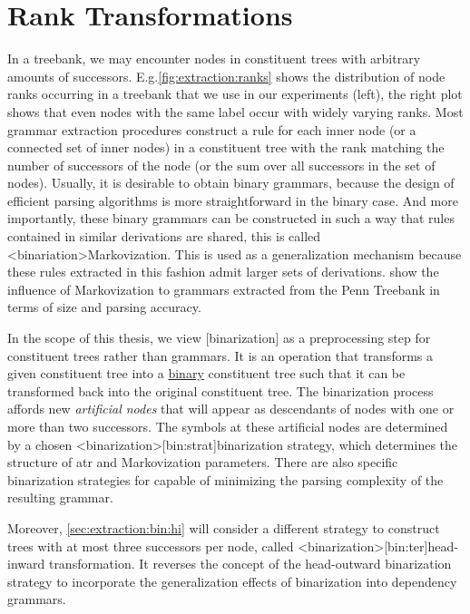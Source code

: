 \documentclass[../../document.tex]{subfiles}
\begin{document}
    \section{Rank Transformations}\label{sec:ranktransformations}
    In a treebank, we may encounter nodes in constituent trees with arbitrary amounts of successors.
    E.g.\@ \cref{fig:extraction:ranks} shows the distribution of node ranks occurring in a treebank that we use in our experiments (left), the right plot shows that even nodes with the same label occur with widely varying ranks.
    Most grammar extraction procedures construct a rule for each inner node (or a connected set of inner nodes) in a constituent tree with the rank matching the number of successors of the node (or the sum over all successors in the set of nodes).
    Usually, it is desirable to obtain binary grammars, because the design of efficient parsing algorithms is more straightforward in the binary case.
    And more importantly, these binary grammars can be constructed in such a way that rules contained in similar derivations are shared, this is called <binariation>{Markovization}.
    This is used as a generalization mechanism because these rules extracted in this fashion admit larger sets of derivations.
    \citet[figure 2]{KleMan03} show the influence of Markovization to grammars extracted from the Penn Treebank in terms of size and parsing accuracy.

    In the scope of this thesis, we view [binarization] as a preprocessing step for constituent trees rather than grammars.
    It is an operation that transforms a given constituent tree into a \hyperlink{binctree}{binary} constituent tree such that it can be transformed back into the original constituent tree.
    The binarization process affords new \emph{artificial nodes} that will appear as descendants of nodes with one or more than two successors.
    The symbols at these artificial nodes are determined by a chosen <binarization>[bin:strat]{binarization strategy}, which determines the structure of atr and Markovization parameters. \citep{Son08,Cra12}
    There are also specific binarization strategies for  capable of minimizing the parsing complexity of the resulting grammar. \citep{Gil10}

    Moreover, \cref{sec:extraction:bin:hi} will consider a different strategy to construct trees with at most three successors per node, called <binarization>[bin:ter]{head-inward transformation}.
    It reverses the concept of the head-outward binarization strategy to incorporate the generalization effects of binarization into dependency grammars.
\end{document}
